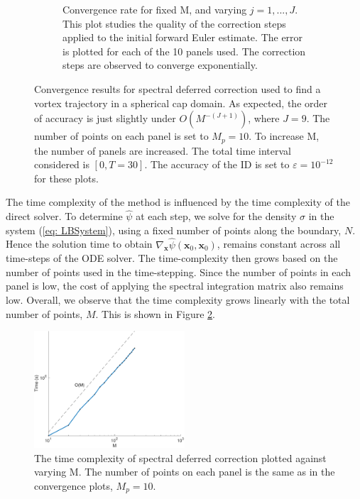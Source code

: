 \documentclass{sfuthesis}
\begin{document}
\begin{figure}[h]
\begin{subfigure}[t]{0.47\textwidth}
                	\caption{Convergence rate for fixed M, and varying $j=1,...,J$. This plot studies the quality of the correction steps applied to the initial forward Euler estimate. The error is plotted for each of the 10 panels used. The correction steps are observed to converge exponentially.}
        \end{subfigure}
        \caption{Convergence results for spectral deferred correction used to find a vortex trajectory in a spherical cap domain. As expected, the order of accuracy is just slightly under $O(M^{-(J+1)})$, where $J=9$. The number of points on each panel is set to $M_p=10$. To increase M, the number of panels are increased. The total time interval considered is $[0,T=30]$. The accuracy of the ID is set to $\varepsilon=10^{-12}$ for these plots.}
      	\label{fig: Ex6-6CapSDCConvergence}
 \end{figure}

The time complexity of the method is influenced by the time complexity of the direct solver. To determine $\hat{\psi}$ at each step, we solve for the density $\sigma$ in the system (\ref{eq: LBSystem}), using a fixed number of points along the boundary, $N$. Hence the solution time to obtain $\nabla_{\mathbf{x}} \hat{\psi}(\mathbf{x}_0, \mathbf{x}_0)$, remains constant across all time-steps of the ODE solver. The time-complexity then grows based on the number of points used in the time-stepping. Since the number of points in each panel is low, the cost of applying the spectral integration matrix also remains low. Overall, we observe that the time complexity grows linearly with the total number of points, $M$. This is shown in Figure \ref{fig: Ex6-6CapSDCTime}. 

 \begin{figure}[h]
 	\centering
	\includegraphics[width=0.5\textwidth]{Ex6-6CapSDCTime}
	\caption{The time complexity of spectral deferred correction plotted against varying M. The number of points on each panel is the same as in the convergence plots, $M_p=10$.}
	\label{fig: Ex6-6CapSDCTime}
 \end{figure}
\end{document}

